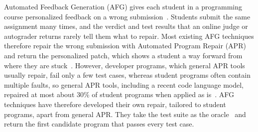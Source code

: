 \documentclass[conference]{IEEEtran}
\begin{document}
Automated Feedback Generation (AFG) gives each student in a programming course personalized feedback on a wrong submission~\cite{keuning2018systematic}. Students submit the same assignment many times, and the verdict and test results that an online judge or autograder returns rarely tell them what to repair. Most existing AFG techniques therefore repair the wrong submission with Automated Program Repair (APR)~\cite{gazzola2017automatic,monperrus2018automatic} and return the personalized patch, which shows a student a way forward from where they are stuck~\cite{wang2018search,gulwani2018automated,hu2019re,choi2025automated}. However, developer programs, which general APR tools usually repair, fail only a few test cases, whereas student programs often contain multiple faults, so general APR tools, including a recent code language model, repaired at most about 30\% of student programs when applied as is~\cite{yi2017feasibility,gu2025can}. AFG techniques have therefore developed their own repair, tailored to student programs, apart from general APR. They take the test suite as the oracle~\cite{barr2014oracle} and return the first candidate program that passes every test case.
\end{document}
